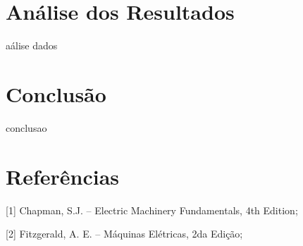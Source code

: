 \documentclass[a4paper, 12pt]{article}
\begin{document}
\section{Análise dos Resultados}


aálise dados
\section{Conclusão}

conclusao



\newpage
\section{Referências}

[1] Chapman, S.J. -- Electric Machinery Fundamentals, 4th Edition;

[2] Fitzgerald, A. E. -- Máquinas Elétricas, 2da Edição;
\end{document}
